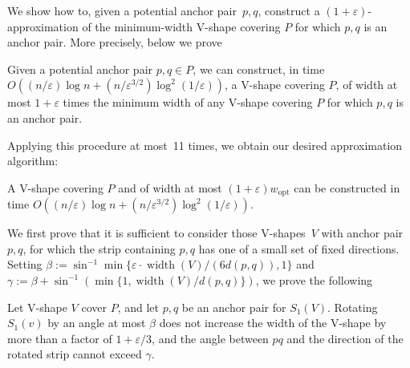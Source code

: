 \documentclass{llncs}
\newcommand{\wopt}{w_{\mathrm{opt}}}
\let\eps\varepsilon
\DeclareMathOperator{\width}{width}
\begin{document}
We show how to, given a potential anchor pair~$p,q$, construct a
$(1+\eps)$-approximation of the minimum-width V-shape covering $P$ for
which $p,q$ is an anchor pair.  More precisely, below we prove
\begin{lemma}
  \label{lem:fixed-anchor-pair}
  Given a potential anchor pair $p,q \in P$, we can construct, in time
  $O((n/\eps)\log n + (n/\eps^{3/2})\log^2(1/\eps))$, a V-shape
  covering $P$, of width at most $1+\eps$ times the minimum width of
  any V-shape covering $P$ for which $p,q$ is an anchor pair.
\end{lemma}

Applying this procedure at most~11 times, we obtain our desired
approximation algorithm:
\begin{theorem}
  A V-shape covering $P$ and of width at most $(1+\eps)\wopt$ can be
  constructed in time $O((n/\eps)\log n + (n/\eps^{3/2})\log^2(1/\eps))$.
\end{theorem}

We first prove that it is sufficient to consider those V-shapes~$V$
with anchor pair $p,q$, for which the strip containing $p,q$ has one
of a small set of fixed directions.  Setting $\beta:=
\sin^{-1}\min\{\eps\cdot\width(V)/(6 d(p,q)),1\}$ and
$\gamma:= \beta + \sin^{-1}(\min\{1,\width(V)/d(p,q)\})$, we
prove the following

\begin{lemma}
  \label{lem:rotate-strip}
  Let V-shape $V$ cover $P$, and let $p,q$ be an anchor pair for
  $S_1(V)$.  Rotating $S_1(v)$ by an angle at most $\beta$ does not
  increase the width of the V-shape by more than a factor of
  $1+\eps/3$, and the angle between $pq$ and the direction of the
  rotated strip cannot exceed $\gamma$.
\end{lemma}
\end{document}
